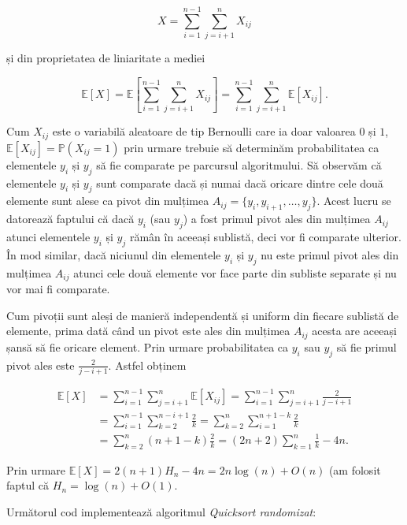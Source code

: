 \documentclass[]{article}
\begin{document}
\[
  X = \sum_{i = 1}^{n-1}\sum_{j = i+1}^{n}X_{ij}
\]

și din proprietatea de liniaritate a mediei

\[
  \mathbb{E}[X] = \mathbb{E}\left[\sum_{i = 1}^{n-1}\sum_{j = i+1}^{n}X_{ij}\right] = \sum_{i = 1}^{n-1}\sum_{j = i+1}^{n}\mathbb{E}[X_{ij}].
\]

Cum \(X_{ij}\) este o variabilă aleatoare de tip Bernoulli care ia doar
valoarea \(0\) și \(1\), \(\mathbb{E}[X_{ij}]=\mathbb{P}(X_{ij}=1)\)
prin urmare trebuie să determinăm probabilitatea ca elementele \(y_i\)
și \(y_j\) să fie comparate pe parcursul algoritmului. Să observăm că
elementele \(y_i\) și \(y_j\) sunt comparate dacă și numai dacă oricare
dintre cele două elemente sunt alese ca pivot din mulțimea
\(A_{ij} = \{y_i,y_{i+1},\ldots, y_j\}\). Acest lucru se datorează
faptului că dacă \(y_i\) (sau \(y_j\)) a fost primul pivot ales din
mulțimea \(A_{ij}\) atunci elementele \(y_i\) și \(y_j\) rămân în
aceeași sublistă, deci vor fi comparate ulterior. În mod similar, dacă
niciunul din elementele \(y_i\) și \(y_j\) nu este primul pivot ales din
mulțimea \(A_{ij}\) atunci cele două elemente vor face parte din
subliste separate și nu vor mai fi comparate.

Cum pivoții sunt aleși de manieră independentă și uniform din fiecare
sublistă de elemente, prima dată când un pivot este ales din mulțimea
\(A_{ij}\) acesta are aceeași șansă să fie oricare element. Prin urmare
probabilitatea ca \(y_i\) sau \(y_j\) să fie primul pivot ales este
\(\frac{2}{j-i+1}\). Astfel obținem

\begin{align*}
  \mathbb{E}[X] &= \sum_{i = 1}^{n-1}\sum_{j = i+1}^{n}\mathbb{E}[X_{ij}] = \sum_{i = 1}^{n-1}\sum_{j = i+1}^{n}\frac{2}{j-i+1} \\
         &= \sum_{i = 1}^{n-1}\sum_{k = 2}^{n-i+1}\frac{2}{k} = \sum_{k = 2}^{n}\sum_{i = 1}^{n+1-k}\frac{2}{k} \\
         &= \sum_{k = 2}^{n}(n+1-k)\frac{2}{k} = (2n+2)\sum_{k = 1}^{n}\frac{1}{k} - 4n.
\end{align*}

Prin urmare \(\mathbb{E}[X] = 2(n+1)H_n - 4n = 2n\log(n) + O(n)\) (am
folosit faptul că \(H_n = \log(n)+O(1)\).

Următorul cod implementează algoritmul \emph{Quicksort randomizat}:
\end{document}
